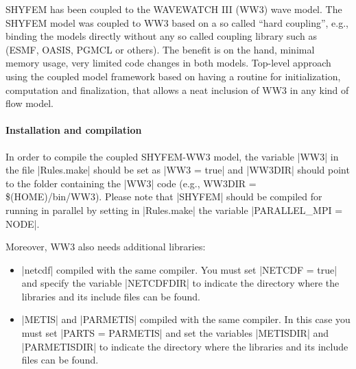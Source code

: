 
%
%
%
%
%
%
%

SHYFEM has been coupled to the WAVEWATCH III (WW3) wave model.  The SHYFEM
model was coupled to WW3 based on a so called ``hard coupling'', e.g.,
binding the models directly without any so called coupling library such as
(ESMF, OASIS, PGMCL or others). The benefit is on the hand, minimal memory
usage, very limited code changes in both models. Top-level approach using
the coupled model framework based on having a routine for initialization,
computation and finalization, that allows a neat inclusion of WW3 in
any kind of flow model.

\paragraph{Installation and compilation}

In order to compile the coupled SHYFEM-WW3 model, the variable |WW3| in the 
file |Rules.make| should be set as |WW3 = true| and |WW3DIR| should
point to the folder containing the |WW3| code 
(e.g., WW3DIR = \$(HOME)/bin/WW3). 
Please note that |SHYFEM| should be compiled for running in parallel 
by setting in |Rules.make|
the variable |PARALLEL_MPI = NODE|.

Moreover, WW3 also needs additional libraries:
\begin{itemize}
\item |netcdf| compiled with the same compiler.  You must set |NETCDF = true|
and specify the variable |NETCDFDIR| to indicate the directory where the 
libraries and its include files can be found.
\item |METIS| and |PARMETIS| compiled with the same compiler. 
In this case you must set
|PARTS = PARMETIS| and set the variables |METISDIR| and |PARMETISDIR|
to indicate the directory where the libraries and its include files can be
found.
\end{itemize}

